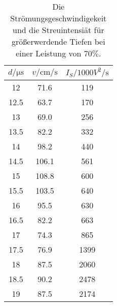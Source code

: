 \begin{table}[H]
    \centering
    \caption{Die Strömungsgeschwindigekeit und die Streuintensiät für größerwerdende Tiefen bei einer Leistung von $70 \%$.}
\begin{tabular}{c c c}
    \toprule
    $d / \si{\micro\second}$ & $ v / \si{\centi \meter \per \second}$ & $I_S / 1000 \si{ V^2 \per \second} $\\
    \midrule
      12 &   71.6 &  119 \\
    12.5 &   63.7 &  170 \\
      13 &   69.0 &  256 \\
    13.5 &  82.2 &  332 \\
      14 &  98.2 &  440 \\
    14.5 &  106.1 &  561 \\
      15 &  108.8 &  600 \\
    15.5 &  103.5 &  640 \\
      16 &  95.5 &  630 \\
    16.5 &  82.2 &  663 \\
      17 &  74.3 &  865 \\
    17.5 &  76.9 &  1399 \\
      18 &  87.5 &  2060 \\
    18.5 &  90.2 & 2478 \\
      19 &  87.5 & 2174 \\
    \bottomrule
    \end{tabular}
\end{table}